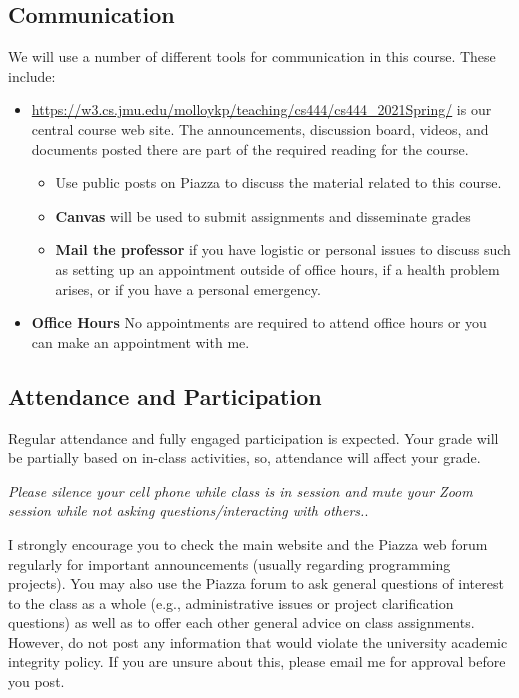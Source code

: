 \documentclass[11pt]{article}
\begin{document}
\subsection{Communication}
We will use a number of different tools for communication in this course.  
These include:
\begin{itemize}
\item \href{https://w3.cs.jmu.edu/molloykp/teaching/cs444/cs444\_2021Spring/}{https://w3.cs.jmu.edu/molloykp/teaching/cs444/cs444\_2021Spring/} is our central course web site. The announcements, discussion
board, videos, and documents posted there are part of the required reading
for the course.
\begin{itemize}
\item Use public posts on Piazza to discuss the material related to this course.
\item \textbf{Canvas} will be used to submit assignments and disseminate grades
\item \textbf{Mail the professor} if you have logistic or
personal issues to discuss such as setting up an appointment
outside of office hours, if a health problem arises, or if you
have a personal emergency.
\end{itemize}
\item \textbf{Office Hours}  No appointments are required to attend office
hours or you can make an appointment with me.
\end{itemize}

\subsection{Attendance and Participation}
Regular attendance and fully engaged participation is expected.  Your grade will be partially 
based on in-class activities, so, attendance will affect your grade.

\emph {Please silence your cell phone while class is in session and mute your Zoom session 
while not asking questions/interacting with others.}. 

I strongly encourage you to check the main website and the Piazza web forum regularly for important
announcements (usually regarding programming projects). You may also use the Piazza forum to ask 
general questions of interest to the class as a whole (e.g., administrative issues or project clarification questions) as 
well as to offer each other general advice on class assignments. However, do not post any information that would 
violate the university academic integrity policy. If you are unsure about this, please email me for approval before you post. 
\end{document}
